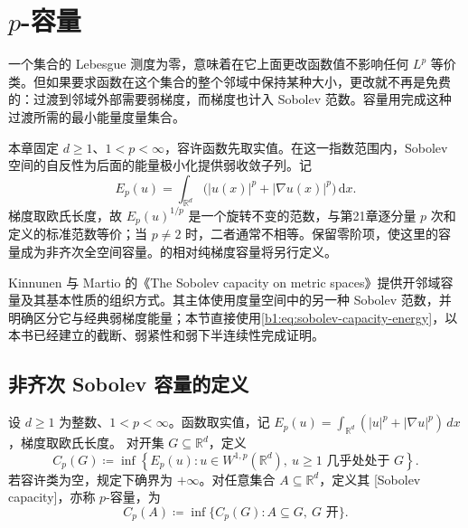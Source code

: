 \section{\texorpdfstring{\(p\)}{p}-容量}
\label{b1:sec:2601}

一个集合的 Lebesgue 测度为零，意味着在它上面更改函数值不影响任何 \(L^p\) 等价类。但如果要求函数在这个集合的整个邻域中保持某种大小，更改就不再是免费的：过渡到邻域外部需要弱梯度，而梯度也计入 Sobolev 范数。容量用完成这种过渡所需的最小能量度量集合。

\ProseParagraphBreak

本章固定 \(d\ge1\)、\(1<p<\infty\)，容许函数先取实值。在这一指数范围内，Sobolev 空间的自反性为后面的能量极小化提供弱收敛子列。记
\begin{equation}\label{b1:eq:sobolev-capacity-energy}
 E_p(u)=\int_{\mathbb R^d}
       \bigl(|u(x)|^p+|\nabla u(x)|^p\bigr)\,\mathrm dx.
\end{equation}
梯度取欧氏长度，故 \(E_p(u)^{1/p}\) 是一个旋转不变的范数，与第21章逐分量 \(p\) 次和定义的标准范数等价；当 \(p\ne2\) 时，二者通常不相等。保留零阶项，使这里的容量成为非齐次全空间容量。的相对纯梯度容量将另行定义。

\ProseParagraphBreak

Kinnunen 与 Martio 的《The Sobolev capacity on metric spaces》\cite[Sections 1 and 3, p. 368]{KinnunenMartio1996Capacity}提供开邻域容量及其基本性质的组织方式。其主体使用度量空间中的另一种 Sobolev 范数，并明确区分它与经典弱梯度能量；本节直接使用\eqref{b1:eq:sobolev-capacity-energy}，以本书已经建立的截断、弱紧性和弱下半连续性完成证明。

\subsection{非齐次 Sobolev 容量的定义}
\label{b1:subsec:260101}

\begin{definition}\label{b1:def:sobolev-capacity}
设 \(d\geq1\) 为整数、\(1<p<\infty\)。函数取实值，记 \(E_p(u)=\int_{\mathbb R^d}(|u|^p+|\nabla u|^p)\,dx\)，梯度取欧氏长度。
对开集 \(G\subseteq\mathbb R^d\)，定义
\[
 C_p(G)\coloneqq\inf\left\{E_p(u):
 u\in W^{1,p}(\mathbb R^d),\
 u\ge1\text{ 几乎处处于 }G\right\}.
\]
若容许类为空，规定下确界为 \(+\infty\)。对任意集合 \(A\subseteq\mathbb R^d\)，定义其 [Sobolev capacity]，亦称 \(p\)-容量，为
\begin{equation}\label{b1:eq:sobolev-outer-capacity}
 C_p(A)\coloneqq\inf\{C_p(G): A\subseteq G,\ G\text{ 开}\}.
\end{equation}
\end{definition}

